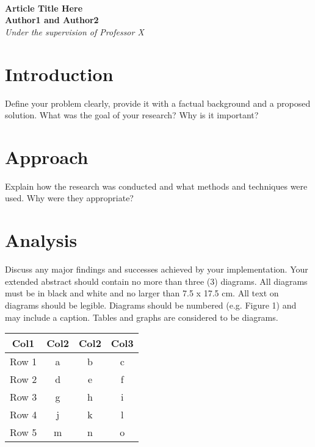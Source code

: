 \documentclass[11pt,a4paper, final, twoside]{article}
\theoremstyle{proposition}
\theoremstyle{definition}
\theoremstyle{remark}
\numberwithin{equation}{section}
\begin{document}



\begin{center}

{\Large \textbf{\\Article Title Here }}\\[5mm]
{\large \textbf{Author1 and Author2}\\[1mm]}
{\normalsize \emph{Under the supervision of Professor X}\\[1mm]}
\end{center}


\section{Introduction}\label{I1}
Define your problem clearly, provide it with a factual background and a proposed solution. What was the goal of your research? Why is it important? \cite {01}

\section{Approach}\label{I2}
Explain how the research was conducted and what methods and techniques were used. Why were they appropriate? \cite {02}

\section{Analysis}\label{I3}
Discuss any major findings and successes achieved by your implementation. \cite {03}
\newline \newline
Your extended abstract should contain no more than three (3) diagrams.  All diagrams must be in black and white and no larger than 7.5 x 17.5 cm.  All text on diagrams should be legible.  Diagrams should be numbered (e.g. Figure 1) and may include a caption.  Tables and graphs are considered to be diagrams. 

\begin{center}
 \begin{tabular}{||c c c c||} 
 \hline
 Col1 & Col2 & Col2 & Col3 \\ [0.5ex] 
 \hline\hline
 Row 1 & a & b & c \\ 
 \hline
 Row 2 & d & e & f \\
 \hline
 Row 3 & g & h & i \\
 \hline
 Row 4 & j & k & l \\
 \hline
 Row 5 & m & n & o \\ [1ex] 
 \hline
\end{tabular}
\end{center}
\end{document}

